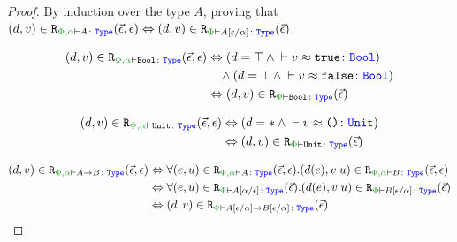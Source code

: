 \begin{framed}
    \begin{proof}
        By induction over the type $A$, proving that $\inLogRel{d}{v}{\P,\a}{A}{\ev, \e} \Leftrightarrow \inLogRelPE{d}{v}{A\ssub{\a}{\e}}$.
    
                \begin{align*}
                    \inLogRel{d}{v}{\P,\a}{\B}{\ev, \e} & \Leftrightarrow (d = \top \wedge \zberelation{v}{\t}{\B})
                    \\ 
                    & \quad\wedge(d = \bot \wedge \zberelation{v}{\f}{\B})
                    \\
                    & \Leftrightarrow  \inLogRelPE{d}{v}{\B}
                \end{align*}
        
            \begin{align*}
                \inLogRel{d}{v}{\P,\a}{\U}{\ev, \e} & \Leftrightarrow (d = \singleton \wedge \zberelation{v}{\u}{\U})
                \\
                & \Leftrightarrow  \inLogRelPE{d}{v}{\U}
            \end{align*}
        
            \case{\tfun}
            \begin{align*}
                \inLogRel{d}{v}{\P,\a}{\ab}{\ev, \e} & \Leftrightarrow \forall\inLogRel{e}{u}{\P,\a}{A}{\ev, \e}. \inLogRel{d(e)}{\apply{v}{u}}{\P,\a}{B}{\ev, \e} 
                \\
                & \Leftrightarrow 
                \forall\inLogRelPE{e}{u}{A\ssub{\e}{\a}}. \inLogRelPE{d(e)}{\apply{v}{u}}{B\ssub{\a}{\e}}
                \\
                & \Leftrightarrow  \inLogRelPE{d}{v}{\fntype{A\ssub{\a}{\e}}{B\ssub{\a}{\e}}}
                \\
            \end{align*}
        
            \case{\teffect}
        

\end{proof}
\end{framed}
